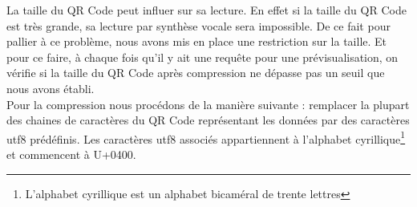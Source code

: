 \par
La taille du QR Code peut influer sur sa lecture. En effet si la taille du QR Code est très grande, sa lecture par synthèse vocale sera impossible. De ce fait pour pallier à ce problème, nous avons mis en place une restriction sur la taille. Et pour ce faire, à chaque fois qu'il y ait une requête pour une prévisualisation, on vérifie si la taille du QR Code après compression ne dépasse pas un seuil que nous avons établi.\\
Pour la compression nous procédons de la manière suivante : remplacer la plupart des chaines de caractères du QR Code représentant les données par des caractères utf8 prédéfinis.
Les caractères utf8 associés appartiennent à l'alphabet cyrillique\footnote{L’alphabet cyrillique est un alphabet bicaméral de trente lettres} et commencent à U+0400.